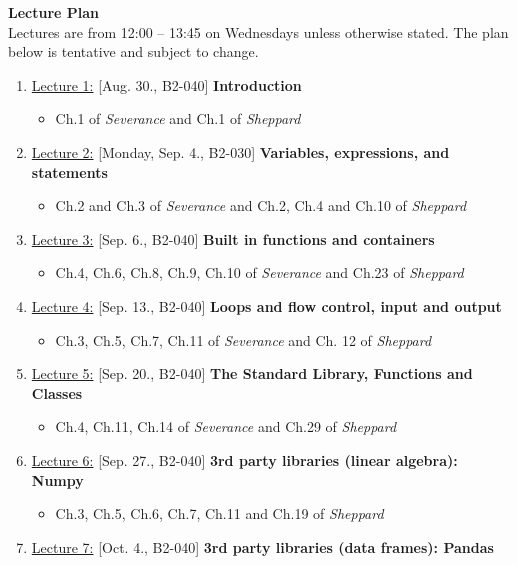 \documentclass[12pt, a4paper]{article}
\begin{document}
\newpage
\noindent\textbf{\large Lecture Plan}\\
Lectures are from 12:00 -- 13:45 on Wednesdays unless otherwise stated.
The plan below is tentative and subject to change.
\begin{enumerate}
    \item[] \underline{Lecture 1:} [Aug. 30., B2-040] {\bf Introduction}
        \begin{itemize}
            \item Ch.1 of {\it Severance} and Ch.1 of {\it Sheppard}
        \end{itemize}
    \item[] \underline{Lecture 2:} [Monday, Sep. 4., B2-030] {\bf Variables, expressions, and statements}
        \begin{itemize}
            \item Ch.2 and Ch.3 of {\it Severance} and Ch.2, Ch.4 and Ch.10 of {\it Sheppard}
        \end{itemize}
    \item[] \underline{Lecture 3:} [Sep. 6., B2-040] {\bf Built in functions and containers}
        \begin{itemize}
            \item Ch.4, Ch.6, Ch.8, Ch.9, Ch.10 of {\it Severance} and Ch.23 of {\it Sheppard}
        \end{itemize}
    \item[] \underline{Lecture 4:} [Sep. 13., B2-040] {\bf Loops and flow control, input and output}
        \begin{itemize}
            \item Ch.3, Ch.5, Ch.7, Ch.11 of {\it Severance} and Ch. 12 of {\it Sheppard}
        \end{itemize}
    \item[] \underline{Lecture 5:} [Sep. 20., B2-040] {\bf The Standard Library, Functions and Classes}
        \begin{itemize}
            \item Ch.4, Ch.11, Ch.14 of {\it Severance} and Ch.29 of {\it Sheppard}
        \end{itemize}
    \item[] \underline{Lecture 6:} [Sep. 27., B2-040] {\bf 3rd party libraries (linear algebra): Numpy}
        \begin{itemize}
            \item Ch.3, Ch.5, Ch.6, Ch.7, Ch.11 and Ch.19 of {\it Sheppard}
        \end{itemize}
    \item[] \underline{Lecture 7:} [Oct. 4., B2-040] {\bf 3rd party libraries (data frames): Pandas}

\end{enumerate}
\end{document}
